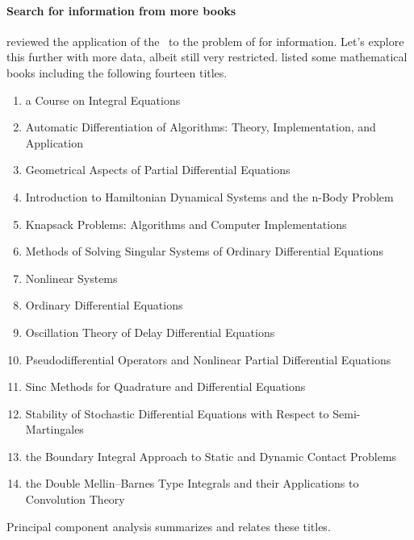 \begin{reduce}
\paragraph{Search for information from more books}
\cite{Berry95} reviewed the application of the \svd\ to the problem of  for information.
Let's explore this further with more data, albeit still very restricted.
\cite{Berry95} listed some mathematical books including the following fourteen titles.
\begin{enumerate}
\item a Course on Integral Equations
\item Automatic Differentiation of Algorithms: Theory, Implementation, and Application
\item Geometrical Aspects of Partial Differential Equations
\item Introduction to Hamiltonian Dynamical Systems and the n-Body Problem
\item Knapsack Problems: Algorithms and Computer Implementations 
\item Methods of Solving Singular Systems of Ordinary Differential Equations
\item Nonlinear Systems
\item Ordinary Differential Equations
\item Oscillation Theory of Delay Differential Equations 
\item Pseudodifferential Operators and Nonlinear Partial Differential Equations
\item Sinc Methods for Quadrature and Differential Equations 
\item Stability of Stochastic Differential Equations with Respect to Semi-Martingales
\item the Boundary Integral Approach to Static and Dynamic Contact Problems
\item the Double Mellin--Barnes Type Integrals and their Applications to Convolution Theory
\end{enumerate}
Principal component analysis summarizes and relates these titles.
\def\temp#1{%
\begin{center}
\def\threevcol{red}
\qview{25}{29} {\begin{tikzpicture}
\begin{axis}[normalsize,font=\footnotesize
  , axis equal image,view={\q}{30}
  ,xmin=0,xmax=1.9,ymin=-0.5,ymax=1.7,zmin=-1.5,zmax=1.1
  ,xlabel={$\vv_1$},ylabel={$\vv_2$},zlabel={$\vv_3$},label shift={-2ex}]
\addplot3+[scatter,only marks,scatter src=explicit,nodes near coords] 

\end{axis}
\end{tikzpicture}}
\end{center}}
\end{reduce}
